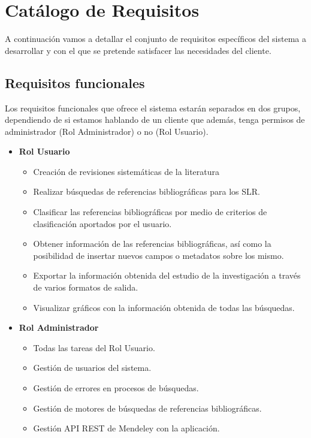 \section{Catálogo de Requisitos}
A continuación vamos a detallar el conjunto de requisitos específicos del sistema a desarrollar y con el que se pretende satisfacer las necesidades del cliente.

\subsection{Requisitos funcionales}
Los requisitos funcionales que ofrece el sistema estarán separados en dos grupos, dependiendo de si estamos hablando de un cliente que además, tenga permisos de administrador (Rol Administrador) o no (Rol Usuario).

\begin{itemize}
	\item \textbf{Rol Usuario}
		\begin{itemize}
			\item Creación de revisiones sistemáticas de la literatura
			\item Realizar búsquedas de referencias bibliográficas para los SLR.
			\item Clasificar las referencias bibliográficas por medio de criterios de clasificación aportados por el usuario.
			\item Obtener información de las referencias bibliográficas, así como la posibilidad de insertar nuevos campos o metadatos sobre los mismo.
			\item Exportar la información obtenida del estudio de la investigación a través de varios formatos de salida.
			\item Visualizar gráficos con la información obtenida de todas las búsquedas.
	\end{itemize}
	\item \textbf{Rol Administrador}
	
	\begin{itemize}
		\item Todas las tareas del Rol Usuario.
		\item Gestión de usuarios del sistema.
		\item Gestión de errores en procesos de búsquedas.
		\item Gestión de motores de búsquedas de referencias bibliográficas.
		\item Gestión API REST de Mendeley con la aplicación.
	\end{itemize}
\end{itemize}

